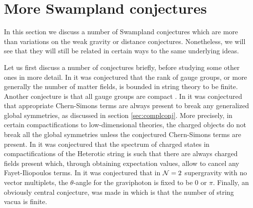 \documentclass[11pt,a4paper]{article}
\numberwithin{equation}{section}
\numberwithin{table}{section}\setlength{\multlinegap}{25pt}
\begin{document}
{%
\section{More Swampland conjectures}
\label{sec:moreswamp}

In this section we discuss a number of Swampland conjectures which are more than variations on the weak gravity or distance conjectures. Nonetheless, we will see that they will still be related in certain ways to the same underlying ideas. 

Let us first discuss a number of conjectures briefly, before studying some other ones in more detail. In \cite{Vafa:2005ui} it was conjectured that the rank of gauge groups, or more generally the number of matter fields, is bounded in string theory to be finite. Another conjecture is that all gauge groups are compact \cite{Banks:2010zn}. In \cite{Montero:2017yja} it was conjectured that appropriate Chern-Simons terms are always present to break any generalized global symmetries, as discussed in section \ref{sec:complconj}. More precisely, in certain compactifications to low-dimensional theories, the charged objects do not break all the global symmetries unless the conjectured Chern-Simons terms are present. In \cite{Aldazabal:2018nsj} it was conjectured that the spectrum of charged states in compactifications of the Heterotic string is such that there are always charged fields present which, through obtaining expectation values, allow to cancel any Fayet-Iliopoulos terms. In \cite{Cecotti:2018ufg} it was conjectured that in ${\cal N}=2$ supergravity with no vector multiplets, the $\theta$-angle for the graviphoton is fixed to be $0$ or $\pi$. Finally, an obviously central conjecture, was made in \cite{DouglasStrings2005} which is that the number of string vacua is finite. 

}
\end{document}
